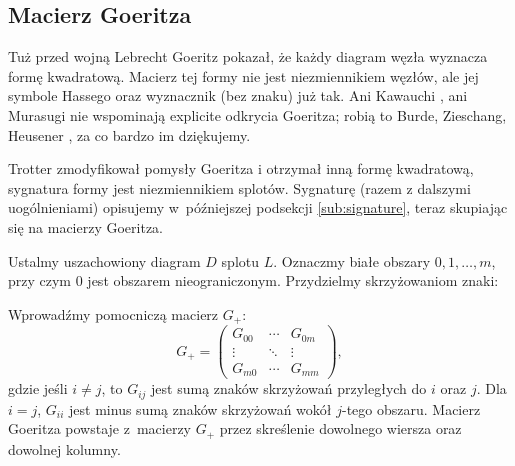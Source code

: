 
\subsection{Macierz Goeritza}
%
Tuż przed wojną Lebrecht Goeritz \cite{goeritz1933} pokazał, że każdy diagram węzła wyznacza formę kwadratową.
Macierz tej formy nie jest niezmiennikiem węzłów, ale jej symbole Hassego oraz wyznacznik (bez znaku) już tak.
%
Ani Kawauchi \cite{kawauchi1996}, ani Murasugi \cite{murasugi1996} nie wspominają explicite odkrycia Goeritza; robią to Burde, Zieschang, Heusener \cite[s. 258-262]{burde2014}, za co bardzo im dziękujemy.

Trotter zmodyfikował pomysły Goeritza i otrzymał inną formę kwadratową, sygnatura formy jest niezmiennikiem splotów.
%
Sygnaturę (razem z dalszymi uogólnieniami) opisujemy w~późniejszej podsekcji \ref{sub:signature}, teraz skupiając się na macierzy Goeritza.

\begin{definition}
    Ustalmy uszachowiony diagram $D$ splotu $L$.
    Oznaczmy białe obszary $0, 1, \ldots, m$, przy czym $0$ jest obszarem nieograniczonym.
    Przydzielmy skrzyżowaniom znaki:
\begin{comment}
    \begin{figure}[H]
        \begin{minipage}[b]{.48\linewidth}
        \centering
        \LargePlusCrossingChessboard
        \end{minipage}
        \begin{minipage}[b]{.48\linewidth}
        \centering
        \LargeMinusCrossingChessboard
        \end{minipage}
    \end{figure}
\end{comment}
    Wprowadźmy pomocniczą macierz $G_+$:
    \begin{equation}
        G_+=\begin{pmatrix}
        G_{00} & \cdots & G_{0m} \\
        \vdots & \ddots & \vdots \\
        G_{m0} & \cdots & G_{mm}
        \end{pmatrix},
    \end{equation}
    gdzie jeśli $i\neq j$, to $G_{ij}$ jest sumą znaków skrzyżowań przyległych do $i$ oraz $j$.
    Dla $i = j$, $G_{ii}$ jest minus sumą znaków skrzyżowań wokół $j$-tego obszaru.
    Macierz Goeritza powstaje z~macierzy $G_+$ przez skreślenie dowolnego wiersza oraz dowolnej kolumny.
\end{definition}

